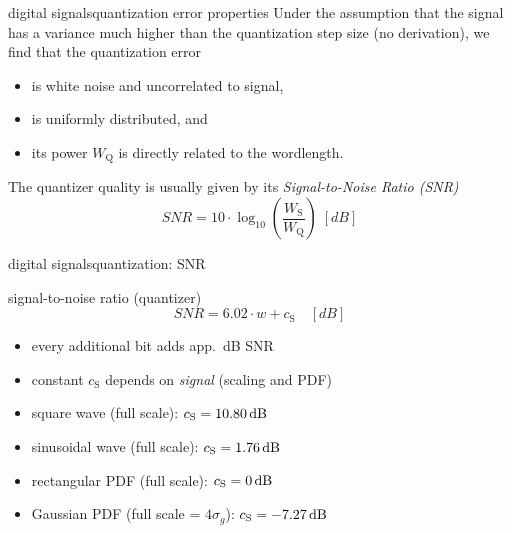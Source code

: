         \begin{frame}{digital signals}{quantization error properties}
            Under the assumption that the signal has a variance much higher than the quantization step size (no derivation), we find that the quantization error
            \begin{itemize}
                \item   is white noise and uncorrelated to signal,
                \item   is uniformly distributed, and
                \item   its power $W_\mathrm{Q}$ is directly related to the wordlength.
            \end{itemize}
            
            \pause
            \bigskip
            The quantizer quality is usually given by its \textit{Signal-to-Noise Ratio (SNR)}
			\begin{equation*}\label{eq:snr}
				SNR = 10\cdot\log_{10}\left(\frac{W_{\mathrm{S}}}{W_{\mathrm{Q}}}\right)\; [dB] 
			\end{equation*}
        \end{frame}	
        
        \begin{frame}{digital signals}{quantization: SNR}
            \vspace{-3mm}
            \toremember{}
            \begin{block}{signal-to-noise ratio (quantizer)}
                \centering
                \begin{equation*}
                    SNR = 6.02\cdot w + c_{\mathrm{S}}\quad [dB]
                \end{equation*}
                \vspace{-5mm}
                \begin{itemize}
                    \item	every additional bit adds app.\ \unit[6]{dB} SNR
                    \item	constant $c_{\mathrm{S}}$ depends on \textit{signal} (scaling and PDF)
                \end{itemize}
            \end{block}
            \pause
            \begin{itemize}
                \item	square wave (full scale): $c_{\mathrm{S}} =  \unit[10.80]{dB}$
                \item	sinusoidal wave (full scale): $c_{\mathrm{S}} =  \unit[1.76]{dB}$
                \item	rectangular {PDF} (full scale): $c_{\mathrm{S}} =  \unit[0]{dB}$
                \item	Gaussian {PDF} (full scale = $4\sigma_{g}$): $c_{\mathrm{S}} =  \unit[-7.27]{dB}$
            \end{itemize}
        \end{frame}		
           
